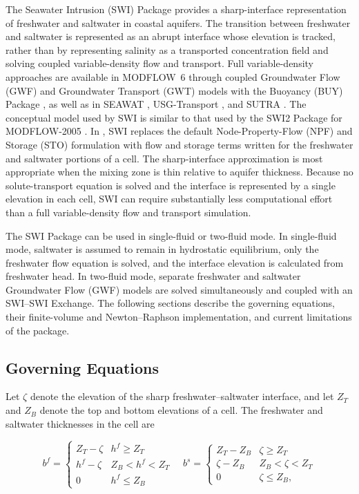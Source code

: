 The Seawater Intrusion (SWI) Package provides a sharp-interface representation of freshwater and saltwater in coastal aquifers. The transition between freshwater and saltwater is represented as an abrupt interface whose elevation is tracked, rather than by representing salinity as a transported concentration field and solving coupled variable-density flow and transport. Full variable-density approaches are available in MODFLOW~6 through coupled Groundwater Flow (GWF) and Groundwater Transport (GWT) models with the Buoyancy (BUY) Package \citep{langevin2020hydraulic,modflow6gwt}, as well as in SEAWAT \citep{langevin2008seawat}, USG-Transport \citep{panday2019bct}, and SUTRA \citep{vosssutra}. The conceptual model used by SWI is similar to that used by the SWI2 Package for MODFLOW-2005 \citep{bakker2013documentation}. In \mf, SWI replaces the default Node-Property-Flow (NPF) and Storage (STO) formulation with flow and storage terms written for the freshwater and saltwater portions of a cell. The sharp-interface approximation is most appropriate when the mixing zone is thin relative to aquifer thickness. Because no solute-transport equation is solved and the interface is represented by a single elevation in each cell, SWI can require substantially less computational effort than a full variable-density flow and transport simulation.

The SWI Package can be used in single-fluid or two-fluid mode. In single-fluid mode, saltwater is assumed to remain in hydrostatic equilibrium, only the freshwater flow equation is solved, and the interface elevation is calculated from freshwater head. In two-fluid mode, separate freshwater and saltwater Groundwater Flow (GWF) models are solved simultaneously and coupled with an SWI--SWI Exchange. The following sections describe the governing equations, their finite-volume and Newton--Raphson implementation, and current limitations of the package.

\subsection{Governing Equations}

Let $\zeta$ denote the elevation of the sharp freshwater--saltwater interface, and let $Z_{T}$ and $Z_{B}$ denote the top and bottom elevations of a cell. The freshwater and saltwater thicknesses in the cell are

\begin{equation}
\label{eqn:swi-thick}
b^{f}=
\begin{cases}
Z_{T}-\zeta & h^{f}\ge Z_{T}\\
h^{f}-\zeta & Z_{B}<h^{f}<Z_{T}\\
0 & h^{f}\le Z_{B}
\end{cases}
\quad
b^{s}=
\begin{cases}
Z_{T}-Z_{B} & \zeta\ge Z_{T}\\
\zeta-Z_{B} & Z_{B}<\zeta<Z_{T}\\
0 & \zeta\le Z_{B},
\end{cases}
\end{equation}

